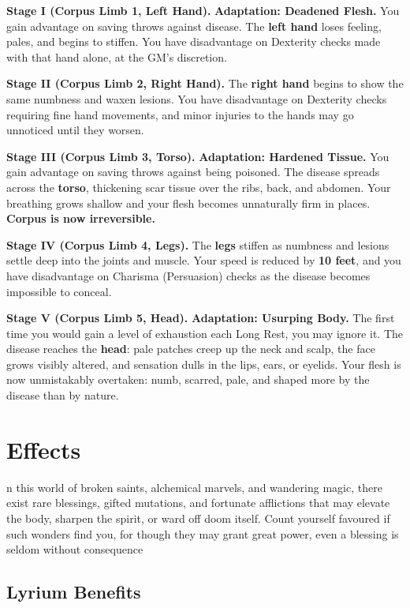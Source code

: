 \documentclass{apotheosis-book}
\begin{document}
\medskip

\textbf{Stage I (Corpus Limb 1, Left Hand).} \textbf{Adaptation: Deadened Flesh.} You gain advantage on saving throws against disease.
The \textbf{left hand} loses feeling, pales, and begins to stiffen. You have disadvantage on Dexterity checks made with that hand alone, at the GM's discretion.

\textbf{Stage II (Corpus Limb 2, Right Hand).} The \textbf{right hand} begins to show the same numbness and waxen lesions. You have disadvantage on Dexterity checks requiring fine hand movements, and minor injuries to the hands may go unnoticed until they worsen.

\textbf{Stage III (Corpus Limb 3, Torso).} \textbf{Adaptation: Hardened Tissue.} You gain advantage on saving throws against being poisoned.
The disease spreads across the \textbf{torso}, thickening scar tissue over the ribs, back, and abdomen. Your breathing grows shallow and your flesh becomes unnaturally firm in places. \textbf{Corpus is now irreversible.}

\textbf{Stage IV (Corpus Limb 4, Legs).} The \textbf{legs} stiffen as numbness and lesions settle deep into the joints and muscle. Your speed is reduced by \textbf{10 feet}, and you have disadvantage on Charisma (Persuasion) checks as the disease becomes impossible to conceal.

\textbf{Stage V (Corpus Limb 5, Head).} \textbf{Adaptation: Usurping Body.} The first time you would gain a level of exhaustion each Long Rest, you may ignore it.
The disease reaches the \textbf{head}: pale patches creep up the neck and scalp, the face grows visibly altered, and sensation dulls in the lips, ears, or eyelids. Your flesh is now unmistakably overtaken: numb, scarred, pale, and shaped more by the disease than by nature.

\section{Effects}

n this world of broken saints, alchemical marvels, and wandering magic, there exist rare blessings, gifted mutations, and fortunate afflictions that may elevate the body, sharpen the spirit, or ward off doom itself. Count yourself favoured if such wonders find you, for though they may grant great power, even a blessing is seldom without consequence

\subsection{Lyrium Benefits}
\end{document}
